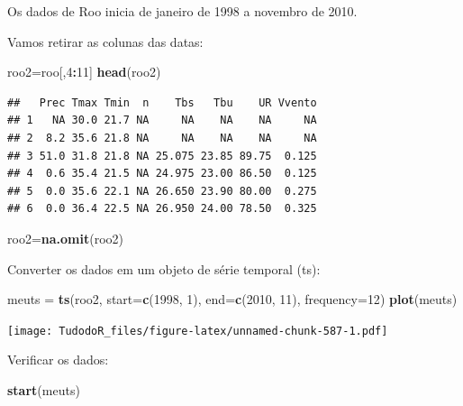 \documentclass[
]{book}
\newenvironment{Shaded}{\begin{snugshade}}{\end{snugshade}}
\newcommand{\DataTypeTok}[1]{\textcolor[rgb]{0.13,0.29,0.53}{#1}}
\newcommand{\DecValTok}[1]{\textcolor[rgb]{0.00,0.00,0.81}{#1}}
\newcommand{\KeywordTok}[1]{\textcolor[rgb]{0.13,0.29,0.53}{\textbf{#1}}}
\newcommand{\NormalTok}[1]{#1}
\newcommand{\OperatorTok}[1]{\textcolor[rgb]{0.81,0.36,0.00}{\textbf{#1}}}
\newcommand{\StringTok}[1]{\textcolor[rgb]{0.31,0.60,0.02}{#1}}
\begin{document}
Os dados de Roo inicia de janeiro de 1998 a novembro de 2010.

Vamos retirar as colunas das datas:

\begin{Shaded}
\begin{Highlighting}[]
\NormalTok{roo2=roo[,}\DecValTok{4}\OperatorTok{:}\DecValTok{11}\NormalTok{]}
\KeywordTok{head}\NormalTok{(roo2)}
\end{Highlighting}
\end{Shaded}

\begin{verbatim}
##   Prec Tmax Tmin  n    Tbs   Tbu    UR Vvento
## 1   NA 30.0 21.7 NA     NA    NA    NA     NA
## 2  8.2 35.6 21.8 NA     NA    NA    NA     NA
## 3 51.0 31.8 21.8 NA 25.075 23.85 89.75  0.125
## 4  0.6 35.4 21.5 NA 24.975 23.00 86.50  0.125
## 5  0.0 35.6 22.1 NA 26.650 23.90 80.00  0.275
## 6  0.0 36.4 22.5 NA 26.950 24.00 78.50  0.325
\end{verbatim}

\begin{Shaded}
\begin{Highlighting}[]
\NormalTok{roo2=}\KeywordTok{na.omit}\NormalTok{(roo2)}
\end{Highlighting}
\end{Shaded}

Converter os dados em um objeto de série temporal (ts):

\begin{Shaded}
\begin{Highlighting}[]
\NormalTok{meuts =}\StringTok{ }\KeywordTok{ts}\NormalTok{(roo2, }\DataTypeTok{start=}\KeywordTok{c}\NormalTok{(}\DecValTok{1998}\NormalTok{, }\DecValTok{1}\NormalTok{), }\DataTypeTok{end=}\KeywordTok{c}\NormalTok{(}\DecValTok{2010}\NormalTok{, }\DecValTok{11}\NormalTok{), }\DataTypeTok{frequency=}\DecValTok{12}\NormalTok{) }
\KeywordTok{plot}\NormalTok{(meuts)}
\end{Highlighting}
\end{Shaded}

\texttt{[image: TudodoR\_files/figure-latex/unnamed-chunk-587-1.pdf]}

Verificar os dados:

\begin{Shaded}
\begin{Highlighting}[]
\KeywordTok{start}\NormalTok{(meuts)}
\end{Highlighting}
\end{Shaded}
\end{document}
